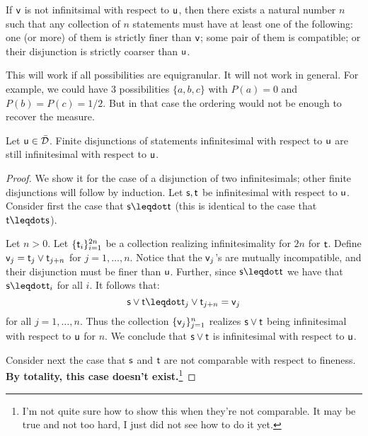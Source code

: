 \documentclass{article}
\begin{document}
If $\stmt[v]$ is not infinitsimal with respect to $\stmt[u]$, then there exists a natural number $n$ such that any collection of $n$ statements must have at least one of the following: one (or more) of them is strictly finer than $\stmt[v]$; some pair of them is compatible; or their disjunction is strictly coarser than $\stmt[u]$. 

This will work if all possibilities are equigranular. It will not work in general. For example, we could have 3 possibilities $\{a,b,c\}$ with $P(a) = 0$ and $P(b)=P(c)=1/2$. But in that case the ordering would not be enough to recover the measure.

\begin{prop}
Let $\stmt[u]\in\tdomain$. Finite disjunctions of statements infinitesimal with respect to $\stmt[u]$ are still infinitesimal with respect to $\stmt[u]$.
\end{prop}
\begin{proof}
We show it for the case of a disjunction of two infinitesimals; other finite disjunctions will follow by induction. Let $\stmt,\stmt[t]$ be infinitesimal with respect to $\stmt[u]$. Consider first the case that $\stmt\finer\stmt[t]$ (this is identical to the case that $\stmt[t]\finer\stmt$). 

Let $n>0$. Let $\{\stmt[t]_i\}_{i=1}^{2n}$ be a collection realizing infinitesimality for $2n$ for $\stmt[t]$. Define $\stmt[v]_j = \stmt[t]_j\OR\stmt[t]_{j+n}$ for $j=1,\ldots,n$. Notice that the $\stmt[v]_j$'s are mutually incompatible, and their disjunction must be finer than $\stmt[u]$. Further, since $\stmt\finer\stmt[t]$ we have that $\stmt\finer\stmt[t]_i$ for all $i$. It follows that:
$$
\stmt\OR\stmt[t] \finer \stmt[t]_j\OR\stmt[t]_{j+n} = \stmt[v]_j
$$
for all $j=1,\ldots,n$. Thus the collection $\{\stmt[v]_j\}_{j=1}^n$ realizes $\stmt\OR\stmt[t]$ being infinitesimal with respect to $\stmt[u]$ for $n$. We conclude that $\stmt\OR\stmt[t]$ is infinitesimal with respect to $\stmt[u]$. 

Consider next the case that $\stmt$ and $\stmt[t]$ are not comparable with respect to fineness. {\bf By totality, this case doesn't exist.}\footnote{I'm not quite sure how to show this when they're not comparable. It may be true and not too hard, I just did not see how to do it yet.}

\end{proof}
\end{document}
